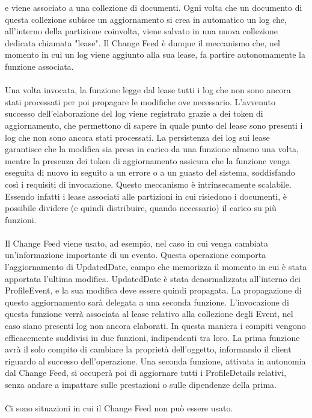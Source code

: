 e viene associato a una collezione di documenti.
Ogni volta che un documento di questa collezione subisce un aggiornamento
si crea in automatico un log che,
all'interno della partizione coinvolta,
viene salvato in una nuova collezione dedicata chiamata "lease".
Il Change Feed è dunque il meccanismo che,
nel momento in cui un log viene aggiunto alla sua lease,
fa partire autonomamente la funzione associata.\\
\\
Una volta invocata,
la funzione legge dal lease tutti i log che non sono ancora stati processati
per poi propagare le modifiche ove necessario.
L'avvenuto successo dell'elaborazione del log viene registrato
grazie a dei token di aggiornamento,
che permettono di sapere in quale punto del lease 
sono presenti i log che non sono ancora stati processati.
La persistenza dei log sui lease garantisce
che la modifica sia presa in carico da una funzione almeno una volta,
mentre la presenza dei token di aggiornamento assicura
che la funzione venga eseguita di nuovo in seguito a un errore o a un guasto del sistema,
soddisfando così i requisiti di invocazione.
Questo meccanismo è intrinsecamente scalabile.
Essendo infatti i lease associati alle partizioni in cui risiedono i documenti,
è possibile dividere (e quindi distribuire, quando necessario) il carico su più funzioni.\\
\\
Il Change Feed viene usato, ad esempio,
nel caso in cui venga cambiata un'informazione importante di un evento.
Questa operazione comporta l'aggiornamento di UpdatedDate,
campo che memorizza il momento in cui è stata apportata l'ultima modifica.
UpdatedDate è stata denormalizzata all'interno dei ProfileEvent,
e la sua modifica deve essere quindi propagata.
La propagazione di questo aggiornamento sarà delegata a una seconda funzione.
L'invocazione di questa funzione verrà associata
al lease relativo alla collezione degli Event,
nel caso siano presenti log non ancora elaborati.
In questa maniera i compiti vengono efficacemente suddivisi in due funzioni,
indipendenti tra loro.
La prima funzione avrà il solo compito di cambiare la proprietà dell'oggetto,
informando il client riguardo al successo dell'operazione.
Una seconda funzione, attivata in autonomia dal Change Feed,
si occuperà poi di aggiornare tutti i ProfileDetails relativi,
senza andare a impattare sulle prestazioni o sulle dipendenze della prima.\\
\\
Ci sono situazioni in cui il Change Feed non può essere usato.
